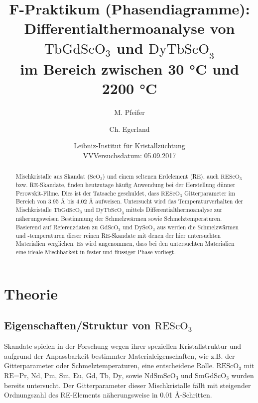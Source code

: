 \documentclass[aps,twocolumn,secnumarabic,nobalancelastpage,amsmath,amssymb,
nofootinbib,superscriptaddress]{revtex4-1}
\begin{document}
\title{F-Praktikum (Phasendiagramme):\\Differentialthermoanalyse von $\text{TbGdScO}_3$
und $\text{DyTbScO}_3$\\im Bereich zwischen 30 °C und 2200 °C}
\author         {M. Pfeifer}
\author         {Ch. Egerland}
\date[Versuchsort: ]{Leibniz-Institut für Kristallzüchtung \\ VVVersuchsdatum: 05.09.2017}


\begin{abstract}
Mischkristalle aus Skandat ($\text{ScO}_3$) und einem seltenen Erdelement (RE), auch $\text{REScO}_3$ bzw. RE-Skandate, finden heutzutage häufig Anwendung bei der Herstellung
dünner Perowskit-Filme. Dies ist der Tatsache geschuldet, dass $\text{REScO}_3$ Gitterparameter im Bereich von 3.95 \AA$\text{ bis}$ 4.02 \AA$\text{ aufweisen.}$
 Untersucht wird das Temperaturverhalten der Mischkristalle $\text{TbGdScO}_3$ und $\text{DyTbScO}_3$ mittels
Differentialthermoanalyse zur näherungsweisen Bestimmung der Schmelzwärmen sowie Schmelztemperaturen.
Basierend auf Referenzdaten zu $\text{Gd}\text{ScO}_3$ und $\text{Dy}\text{ScO}_3$ aus \cite{paperK} werden die Schmelzwärmen und -temperaturen dieser
reinen RE-Skandate mit denen der hier untersuchten Materialien verglichen. Es wird angenommen, dass bei den untersuchten Materialien eine ideale Mischbarkeit in fester und
flüssiger Phase vorliegt.

\end{abstract}


\maketitle


\section{Theorie}
\subsection{Eigenschaften/Struktur von $\text{REScO}_3$}
\noindent Skandate spielen in der Forschung wegen ihrer speziellen Kristallstruktur und aufgrund der Anpassbarkeit bestimmter Materialeigenschaften, wie z.B. der
Gitterparameter oder Schmelztemperaturen, eine entscheidene Rolle. $\text{REScO}_3$ mit $\text{RE=Pr, Nd, Pm, Sm, Eu, Gd, Tb, Dy}$, sowie $\text{NdSmScO}_3$ und $\text{SmGdScO}_3$ wurden bereits untersucht.
Der Gitterparameter dieser Mischkristalle fällt mit steigender Ordnungszahl des RE-Elements näherungsweise in 0.01 \AA-Schritten. \cite{paperK}
\end{document}
